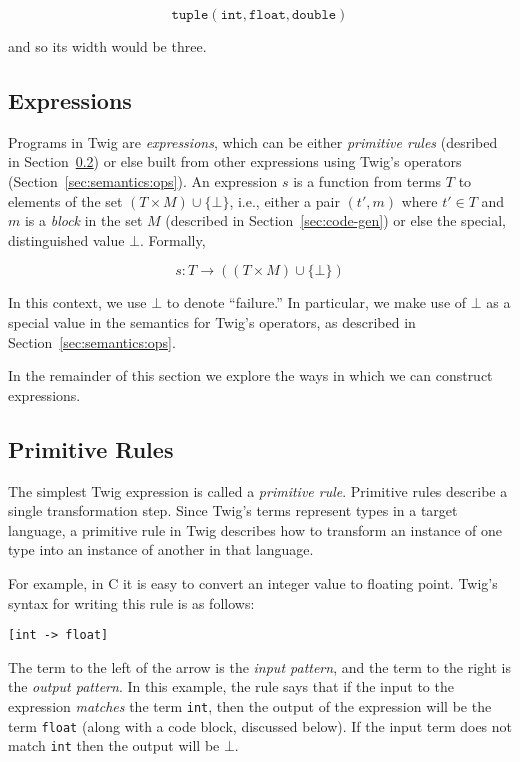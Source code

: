 \[
\mathtt{tuple(int,float,double)}
\]

and so its width would be three.

\subsection{Expressions}

Programs in Twig are \emph{expressions}, which can be either \emph{primitive rules} (desribed in  Section~\ref{sec:semantics:prims}) or else built from other expressions using Twig's operators (Section~\ref{sec:semantics:ops}). An expression $s$ is a function from terms $T$ to elements of the set $(T \times M) \cup \{\bot\}$, i.e., either a pair $(t',m)$ where $t' \in T$ and $m$ is a \emph{block} in the set $M$ (described in Section~\ref{sec:code-gen}) or else the special, distinguished value $\bot$. Formally,

\[
s : T \to ((T \times M) \cup \{\bot\})
\]

In this context, we use $\bot$ to denote ``failure.'' In particular, we make use of $\bot$ as a special value in the semantics for Twig's operators, as described in Section~\ref{sec:semantics:ops}.

In the remainder of this section we explore the ways in which we can construct expressions.

\subsection{Primitive Rules}
\label{sec:semantics:prims}

The simplest Twig expression is called a \emph{primitive rule}.
Primitive rules describe a single transformation step. Since
Twig's terms represent types in a target language, a primitive
rule in Twig describes how to transform an instance of one type
into an instance of another in that language.

For example, in C it is easy to convert an integer value to
floating point. Twig's syntax for writing this rule is as follows:

\begin{verbatim}
[int -> float]
\end{verbatim}

The term to the left of the arrow is the \emph{input pattern}, and the term to the right is the \emph{output pattern}. In this example, the rule says that if the input to the expression \emph{matches} the term \texttt{int}, then the output of the expression will be the term \texttt{float} (along with a code block, discussed below). If the input term does not match \texttt{int} then the output will be $\bot$.

